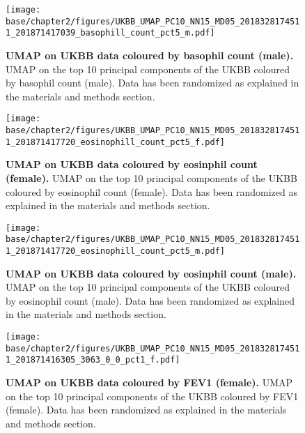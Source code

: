 \newpage

\begin{figure}[ht]
    \centering
    \texttt{[image: base/chapter2/figures/UKBB\_UMAP\_PC10\_NN15\_MD05\_2018328174511\_201871417039\_basophill\_count\_pct5\_m.pdf]}
    \caption[UMAP on UKBB data coloured by basophil count (male)]{\textbf{UMAP on UKBB data coloured by basophil count (male).} UMAP on the top 10 principal components of the UKBB coloured by basophil count (male). Data has been randomized as explained in the materials and methods section.}
    \label{fig:supp_ukbb_basophill_m}
\end{figure}

\newpage

\begin{figure}[ht]
    \centering
    \texttt{[image: base/chapter2/figures/UKBB\_UMAP\_PC10\_NN15\_MD05\_2018328174511\_201871417720\_eosinophill\_count\_pct5\_f.pdf]}
    \caption[UMAP on UKBB data coloured by eosinphil count (female)]{\textbf{UMAP on UKBB data coloured by eosinphil count (female).} UMAP on the top 10 principal components of the UKBB coloured by eosinophil count (female). Data has been randomized as explained in the materials and methods section.}
    \label{fig:supp_ukbb_eosinophill_f}
\end{figure}

\newpage

\begin{figure}[ht]
    \centering
    \texttt{[image: base/chapter2/figures/UKBB\_UMAP\_PC10\_NN15\_MD05\_2018328174511\_201871417720\_eosinophill\_count\_pct5\_m.pdf]}
    \caption[UMAP on UKBB data coloured by eosinphil count (male)]{\textbf{UMAP on UKBB data coloured by eosinphil count (male).} UMAP on the top 10 principal components of the UKBB coloured by eosinophil count (male). Data has been randomized as explained in the materials and methods section.}
    \label{fig:supp_ukbb_eosinophill_m}
\end{figure}

\newpage

\begin{figure}[ht]
    \centering
    \texttt{[image: base/chapter2/figures/UKBB\_UMAP\_PC10\_NN15\_MD05\_2018328174511\_201871416305\_3063\_0\_0\_pct1\_f.pdf]}
    \caption[UMAP on UKBB data coloured by FEV1 (female)]{\textbf{UMAP on UKBB data coloured by FEV1 (female).} UMAP on the top 10 principal components of the UKBB coloured by FEV1 (female). Data has been randomized as explained in the materials and methods section.}
    \label{fig:supp_ukbb_fev_f}
\end{figure}

